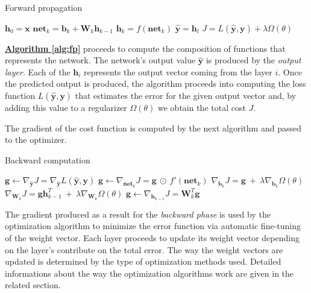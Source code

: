 \begin{algorithm}[H]
	\caption{Forward propagation}
	\label{alg:fp}
	\begin{algorithmic}[1]
		\State $\mathbf{h}_{0} = \mathbf{x}$
		\State $\mathbf{net}_{k} = \mathbf{b}_{k} + \mathbf{W}_{k}\mathbf{h}_{k - 1}$
		\State $\mathbf{h}_{k} = f(\mathbf{net}_{k})$
		\EndFor
		\State $\mathbf{\hat{y}} = \mathbf{h}_{l}$
		\State $J = L(\mathbf{\hat{y}}, \mathbf{y}) + \lambda \Omega(\theta)$
	\end{algorithmic}
\end{algorithm}

\hyperref[alg:fp]{\textbf{Algorithm \ref{alg:fp}}} proceeds to compute the composition of functions that represents the network. The network's output value ${\hat{\textbf{y}}}$ is produced by the \textit{output layer}. Each of the ${\textbf{h}}_i$ represents the output vector coming from the layer $\textit{i}$. Once the predicted output is produced, the algorithm proceeds into computing the loss function $L(\mathbf{\hat{\textbf{y}}}, \mathbf{\textbf{y}})$ that estimates the error for the given output vector and, by adding this value to a regularizer $\Omega(\theta)$ we obtain the total cost $\textit{J}$.

The gradient of the cost function is computed by the next algorithm and passed to the optimizer. 

\begin{algorithm}[H]
	\caption{Backward computation}
	\label{alg:bp}
	\begin{algorithmic}[1]
		\State $\mathbf{g} \leftarrow \nabla_{\hat{\mathbf{y}}}J = \nabla_{\hat{\mathbf{y}}}
		L(\mathbf{\hat{y}}, \mathbf{y})$
		\State $\mathbf{g} \leftarrow \nabla_{\mathbf{net}_{k}}J = \mathbf{g} \ \odot \
		f'(\mathbf{net}_{k})$
		\State $\nabla_{\mathbf{b}_{k}}J = \mathbf{g} \ + \ \lambda \nabla_{\mathbf{b}_{k}}
		\Omega(\theta)$
		\State $\nabla_{\mathbf{W}_{k}}J = \mathbf{g}\mathbf{h}_{k - 1}^{T} \ + \ \lambda
		\nabla_{\mathbf{W}_{k}} \Omega(\theta)$
		\State $\mathbf{g} \leftarrow \nabla_{\mathbf{h}_{k - 1}}J = \mathbf{W}_{k}^{T}\mathbf{g}$
		\EndFor
	\end{algorithmic}
\end{algorithm}

The gradient produced as a result for the \textit{backward phase} is used by the optimization algorithm to minimize the error function via automatic fine-tuning of the weight vector. Each layer proceeds to update its weight vector depending on the layer's contribute on the total error. The way the weight vectors are updated is determined by the type of optimization methods used. Detailed informations about the way the optimization algorithms work are given in the related section.

